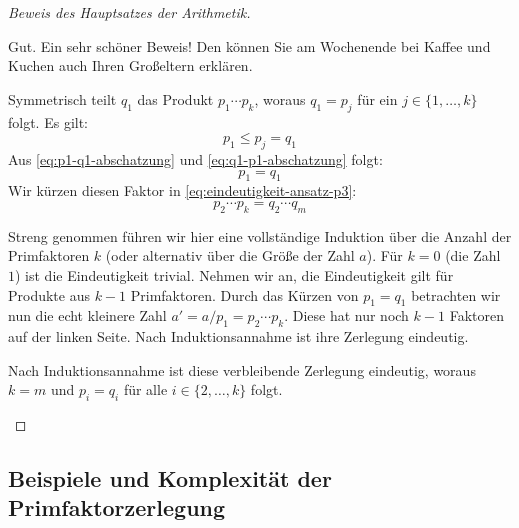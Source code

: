 \begin{proof}[Beweis des Hauptsatzes der Arithmetik]
\begin{spoken-clean}[00:56:08 - 00:58:16]
Gut. Ein sehr schöner Beweis! Den können Sie am Wochenende bei Kaffee und Kuchen auch Ihren Großeltern erklären.
\end{spoken-clean}

\begin{math-stroke}
Symmetrisch teilt $q_1$ das Produkt $p_1 \cdots p_k$, woraus $q_1 = p_j$ für ein $j \in \{1, \dots, k\}$ folgt. Es gilt:
\begin{equation}\label{eq:q1-p1-abschatzung}
p_1 \le p_j = q_1
\end{equation}
Aus \eqref{eq:p1-q1-abschatzung} und \eqref{eq:q1-p1-abschatzung} folgt:
\[ p_1 = q_1 \]
Wir kürzen diesen Faktor in \eqref{eq:eindeutigkeit-ansatz-p3}:
\[ p_2 \cdots p_k = q_2 \cdots q_m \]
\begin{explanation-of-steps}
Streng genommen führen wir hier eine vollständige Induktion über die Anzahl der Primfaktoren $k$ (oder alternativ über die Größe der Zahl $a$). Für $k=0$ (die Zahl $1$) ist die Eindeutigkeit trivial. Nehmen wir an, die Eindeutigkeit gilt für Produkte aus $k-1$ Primfaktoren. Durch das Kürzen von $p_1 = q_1$ betrachten wir nun die echt kleinere Zahl $a' = a / p_1 = p_2 \cdots p_k$. Diese hat nur noch $k-1$ Faktoren auf der linken Seite. Nach Induktionsannahme ist ihre Zerlegung eindeutig.
\end{explanation-of-steps}
Nach Induktionsannahme ist diese verbleibende Zerlegung eindeutig, woraus $k = m$ und $p_i = q_i$ für alle $i \in \{2, \dots, k\}$ folgt.
\end{math-stroke}
\end{proof}

\subsection{Beispiele und Komplexität der Primfaktorzerlegung}

